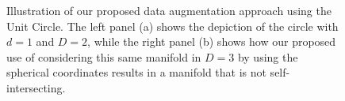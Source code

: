 \documentclass[11pt,reqno]{article}
\theoremstyle{definition}
\begin{document}
\begin{figure}[ht]
  \centering
  \hfill
  \caption{Illustration of our proposed data augmentation approach using the Unit Circle. The left panel (a) shows the depiction of the circle with $d=1$ and $D=2$, while the right panel (b) shows how our proposed use of considering this same manifold in $D=3$ by using the spherical coordinates results in a manifold that is not self-intersecting.}
  \label{fig:unit_circle_augmentation}
\end{figure}
\end{document}
